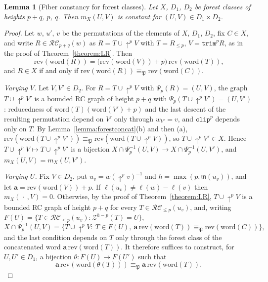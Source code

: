 \documentclass{amsart}
\newtheorem{lemma}{Lemma}[subsection]
\theoremstyle{definition}
\theoremstyle{remark}
\numberwithin{equation}{subsection}
\newcommand{\shup}{{\uparrow}}
\newcommand{\wof}[1]{w_{#1}}
\newcommand{\trm}{\mathtt{trim}}
\newcommand{\zeromap}{\mathcal{Z}}
\newcommand{\clp}{\mathtt{clip}}
\newcommand{\RC}{\mathcal{RC}}
\newcommand{\forest}{\mathfrak{P}}
\newcommand{\maxd}{\mathfrak{m}}
\begin{document}
\begin{lemma}[Fiber constancy for forest classes]\label{lemma:forestfibers}
Let $X$, $D_1$, $D_2$ be forest classes of heights $p+q$, $p$, $q$. Then $m_X(U,V)$ is constant for $(U,V)\in D_1\times D_2$.
\end{lemma}
\begin{proof}
Let $w$, $u'$, $v$ be the permutations of the elements of $X$, $D_1$, $D_2$, fix $C\in X$, and write $R\in\RC_{p+q}(w)$ as $R=T\cup\shup^pV$ with $T=R_{\leq p}$, $V=\trm^pR$, as in the proof of Theorem~\ref{theorem:LR}. Then
$$\mathrm{rev}(\mathrm{word}(R))=\bigl(\mathrm{rev}(\mathrm{word}(V))+p\bigr)\,\mathrm{rev}(\mathrm{word}(T))\text{,}$$
and $R\in X$ if and only if $\mathrm{rev}(\mathrm{word}(R))\equiv_\forest\mathrm{rev}(\mathrm{word}(C))$.

\emph{Varying $V$.} Let $V,V'\in D_2$. For $R=T\cup\shup^pV$ with $\Psi_p(R)=(U,V)$, the graph $T\cup\shup^pV'$ is a bounded RC graph of height $p+q$ with $\Psi_p(T\cup\shup^pV')=(U,V')$: reducedness of $\mathrm{word}(T)(\mathrm{word}(V')+p)$ and the last descent of the resulting permutation depend on $V'$ only through $\wof{V'}=v$, and $\clp^p$ depends only on $T$. By Lemma~\ref{lemma:forestconcat}(b) and then (a), $\mathrm{rev}(\mathrm{word}(T\cup\shup^pV'))\equiv_\forest\mathrm{rev}(\mathrm{word}(T\cup\shup^pV))$, so $T\cup\shup^pV'\in X$. Hence $T\cup\shup^pV\mapsto T\cup\shup^pV'$ is a bijection $X\cap\Psi_p^{-1}(U,V)\to X\cap\Psi_p^{-1}(U,V')$, and $m_X(U,V)=m_X(U,V')$.

\emph{Varying $U$.} Fix $V\in D_2$, put $u_v=w(\shup^pv)^{-1}$ and $h=\max(p,\maxd(u_v))$, and let $\mathbf a=\mathrm{rev}(\mathrm{word}(V))+p$. If $\ell(u_v)\neq\ell(w)-\ell(v)$ then $m_X(\,\cdot\,,V)=0$. Otherwise, by the proof of Theorem~\ref{theorem:LR}, $T\cup\shup^pV$ is a bounded RC graph of height $p+q$ for every $T\in\RC_{\leq p}(u_v)$, and, writing $F(U)=\{T\in\RC_{\leq p}(u_v):\zeromap^{h-p}(T)=U\}$,
$$X\cap\Psi_p^{-1}(U,V)=\{T\cup\shup^pV:\ T\in F(U),\ \mathbf a\,\mathrm{rev}(\mathrm{word}(T))\equiv_\forest\mathrm{rev}(\mathrm{word}(C))\}\text{,}$$
and the last condition depends on $T$ only through the forest class of the concatenated word $\mathbf a\,\mathrm{rev}(\mathrm{word}(T))$. It therefore suffices to construct, for $U,U'\in D_1$, a bijection $\theta\colon F(U)\to F(U')$ such that
$$\mathbf a\,\mathrm{rev}(\mathrm{word}(\theta(T)))\equiv_\forest
\mathbf a\,\mathrm{rev}(\mathrm{word}(T)).$$


\end{proof}
\end{document}
